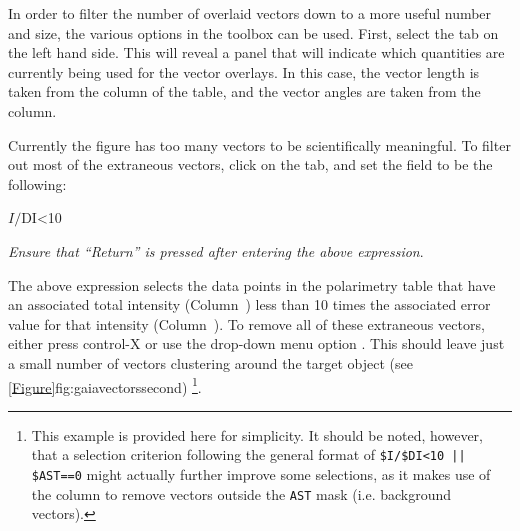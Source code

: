 In order to filter the number of overlaid vectors down to a more
useful number and size, the various options in the
 toolbox can be used. First, select the
 tab on the
left hand side. This will reveal a panel that will indicate which
quantities are currently being used for the vector overlays. In this
case, the vector length is taken from the  column of the table, and
the vector angles are taken from the  column.

Currently the figure has too many vectors to be scientifically
meaningful. To filter out most of the extraneous vectors, click on the
 tab, and set the  field to be the following:

\begin{terminalv}
$I/$DI<10
\end{terminalv}

\emph{Ensure that ``Return'' is pressed after entering the above expression}.

The above expression selects the data points in the polarimetry table
that have an associated total intensity (Column~) less than 10 times
the associated error value for that intensity (Column~). To remove
all of these extraneous vectors, either press control-X or use the
drop-down menu option .  This should leave just a
small number of vectors clustering around the target object (see
\cref{Figure}{fig:gaiavectorssecond}{})
\footnote{This example is provided here for simplicity. It should be noted, however,
that a selection criterion following the general format of \texttt{\$I/\$DI<10 || \$AST==0}
might actually further improve some selections, as it makes use of the
 column to remove vectors outside the \texttt{AST} mask (i.e. background vectors).}.

